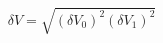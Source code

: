 \begin{equation}
\label{eq:delta_V_Malus}
\delta V = \sqrt{ (\delta V_0)^2 (\delta V_1)^2}
\end{equation}